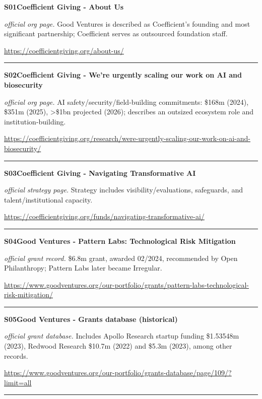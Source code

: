 \hypertarget{src:S01}{}\noindent\textbf{S01}\quad \textbf{Coefficient Giving - About Us}\hfill{}\par
\smallskip
\noindent\textit{official org page.} Good Ventures is described as Coefficient's founding and most significant partnership; Coefficient serves as outsourced foundation staff.\par
\noindent\url{https://coefficientgiving.org/about-us/}\par
\medskip\hrule\medskip

\hypertarget{src:S02}{}\noindent\textbf{S02}\quad \textbf{Coefficient Giving - We're urgently scaling our work on AI and biosecurity}\hfill{}\par
\smallskip
\noindent\textit{official org page.} AI safety/security/field-building commitments: \$168m (2024), \$351m (2025), >\$1bn projected (2026); describes an outsized ecosystem role and institution-building.\par
\noindent\url{https://coefficientgiving.org/research/were-urgently-scaling-our-work-on-ai-and-biosecurity/}\par
\medskip\hrule\medskip

\hypertarget{src:S03}{}\noindent\textbf{S03}\quad \textbf{Coefficient Giving - Navigating Transformative AI}\hfill{}\par
\smallskip
\noindent\textit{official strategy page.} Strategy includes visibility/evaluations, safeguards, and talent/institutional capacity.\par
\noindent\url{https://coefficientgiving.org/funds/navigating-transformative-ai/}\par
\medskip\hrule\medskip

\hypertarget{src:S04}{}\noindent\textbf{S04}\quad \textbf{Good Ventures - Pattern Labs: Technological Risk Mitigation}\hfill{}\par
\smallskip
\noindent\textit{official grant record.} \$6.8m grant, awarded 02/2024, recommended by Open Philanthropy; Pattern Labs later became Irregular.\par
\noindent\url{https://www.goodventures.org/our-portfolio/grants/pattern-labs-technological-risk-mitigation/}\par
\medskip\hrule\medskip

\hypertarget{src:S05}{}\noindent\textbf{S05}\quad \textbf{Good Ventures - Grants database (historical)}\hfill{}\par
\smallskip
\noindent\textit{official grant database.} Includes Apollo Research startup funding \$1.53548m (2023), Redwood Research \$10.7m (2022) and \$5.3m (2023), among other records.\par
\noindent\url{https://www.goodventures.org/our-portfolio/grants-database/page/109/?limit=all}\par
\medskip\hrule\medskip

